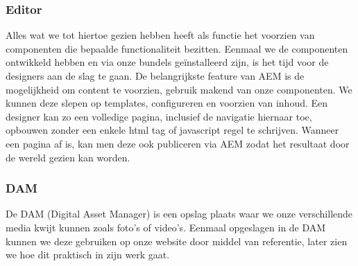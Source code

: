 \documentclass{article}
\begin{document}
	\subsubsection{Editor}
	Alles wat we tot hiertoe gezien hebben heeft als functie het voorzien van componenten die bepaalde functionaliteit bezitten. Eenmaal we de componenten ontwikkeld hebben en via onze bundels geïnstalleerd zijn, is het tijd voor de designers aan de slag te gaan. De belangrijkste feature van AEM is de mogelijkheid om content te voorzien, gebruik makend van onze componenten. We kunnen deze slepen op templates, configureren en voorzien van inhoud. Een designer kan zo een volledige pagina, inclusief de navigatie hiernaar toe, opbouwen zonder een enkele html tag of javascript regel te schrijven. Wanneer een pagina af is, kan men deze ook publiceren via AEM zodat het resultaat door de wereld gezien kan worden.
	\subsubsection{DAM}
	De DAM (Digital Asset Manager) is een opslag plaats waar we onze verschillende media kwijt kunnen zoals foto's of video's. Eenmaal opgeslagen in de DAM kunnen we deze gebruiken op onze website door middel van referentie, later zien we hoe dit praktisch in zijn werk gaat.
\end{document}

